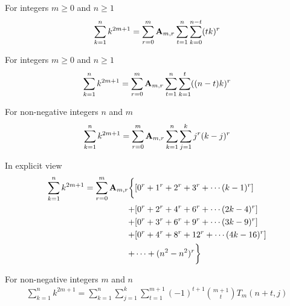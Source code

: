 \begin{corollary}
    \label{cor:sums-of-odd-powers-compact-form}
    For integers $m\geq 0$ and $n \geq 1$
    \begin{align*}
        \sum_{k=1}^{n} k^{2m+1}
        = \sum_{r=0}^{m} {\mathbf{A}} \sb{m,r} \sum_{t=1}^{n} \sum_{k=0}^{n-t} (tk)^r
    \end{align*}
\end{corollary}
\begin{corollary}
    \label{cor:sums-of-odd-powers-compact-form-reindexed}
    For integers $m\geq 0$ and $n \geq 1$
    \begin{align*}
        \sum_{k=1}^{n} k^{2m+1}
        = \sum_{r=0}^{m} {\mathbf{A}} \sb{m,r} \sum_{t=1}^{n} \sum_{k=1}^{t} ((n-t)k)^r
    \end{align*}
\end{corollary}

\begin{proposition}
    \label{prop:sums-of-odd-powers-triple}
    For non-negative integers $n$ and $m$
    \begin{align*}
        \sum_{k=1}^{n} k^{2m+1} = \sum_{r=0}^{m} {\mathbf{A}} \sb{m,r} \sum_{k=1}^{n} \sum_{j=1}^{k} j^r (k-j)^r
    \end{align*}
\end{proposition}
In explicit view
\begin{align*}
    \sum_{k=1}^{n} k^{2m+1} = \sum_{r=0}^{m} {\mathbf{A}} \sb{m,r} \bigg \{
    &[0^r + 1^r + 2^r + 3^r + \cdots (k-1)^r] \\
    + &[0^r + 2^r + 4^r + 6^r + \cdots (2k-4)^r] \\
    + &[0^r + 3^r + 6^r + 9^r + \cdots (3k-9)^r] \\
    + &[0^r + 4^r + 8^r + 12^r + \cdots (4k-16)^r] \\
    + &\cdots + (n^2 - n^2)^r
    \bigg \}
\end{align*}

\begin{proposition}
    \label{prop:sums-of-odd-power-decomposition-forward}
    For non-negative integers $m$ and $n$
    \begin{align*}
        \sum_{k=1}^{n} k^{2m+1} = \sum_{k=1}^{n} \sum_{j=1}^{k} \sum_{t=1}^{m+1} (-1)^{t+1} \binom{m+1}{t} T_{m} (n+t, j)
    \end{align*}
\end{proposition}

